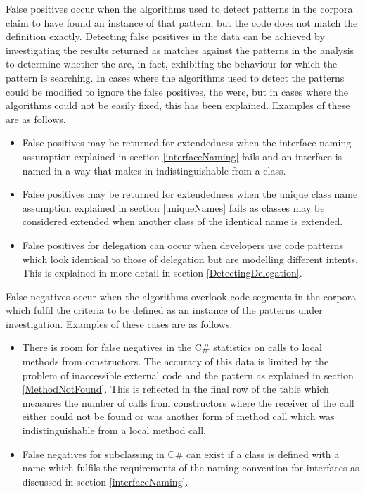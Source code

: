 False positives occur when the algorithms used to detect patterns in the corpora claim to have found an instance of that pattern, but the code does not match the definition exactly. Detecting false positives in the data can be achieved by investigating the results returned as matches against the patterns in the analysis to determine whether the are, in fact, exhibiting the behaviour for which the pattern is searching. In cases where the algorithms used to detect the patterns could be modified to ignore the false positives, the were, but in cases where the algorithms could not be easily fixed, this has been explained. Examples of these are as follows.
\begin{itemize}
	\item False positives may be returned for extendedness when the interface naming assumption explained in section \ref{interfaceNaming} fails and an interface is named in a way that makes in indistinguishable from a class.
	\item False positives may be returned for extendedness when the unique class name assumption explained in section \ref{uniqueNames} fails as classes may be considered extended when another class of the identical name is extended.
	\item False positives for delegation can occur when developers use code patterns which look identical to those of delegation but are modelling different intents. This is explained in more detail in section \ref{DetectingDelegation}.
	\newline
\end{itemize} 

False negatives occur when the algorithms overlook code segments in the corpora which fulfil the criteria to be defined as an instance of the patterns under investigation. Examples of these cases are as follows.
\begin{itemize}
	\item There is room for false negatives in the C\# statistics on calls to local methods from constructors. The accuracy of this data is limited by the problem of inaccessible external code and the  pattern as explained in section \ref{MethodNotFound}. This is reflected in the final row of the table which measures the number of calls from constructors where the receiver of the call either could not be found or was another form of method call which was indistinguishable from a local method call.
	\item False negatives for subclassing in C\# can exist if a class is defined with a name which fulfils the requirements of the naming convention for interfaces as discussed in section \ref{interfaceNaming}.
\end{itemize}








